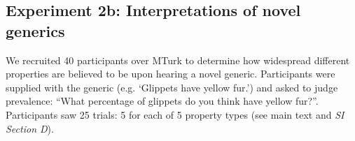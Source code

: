 \documentclass[10pt,letterpaper]{article}
\begin{document}
\subsection{Experiment 2b: Interpretations of novel generics}
We recruited 40 participants over MTurk to determine how widespread different properties are believed to be upon hearing a novel generic.  
Participants were supplied with the generic (e.g. `Glippets have yellow fur.') and asked to judge prevalence: ``What percentage of glippets do you think have yellow fur?''. 
Participants saw 25 trials: 5 for each of 5 property types (see main text and {\it SI Section D}).
\end{document}
